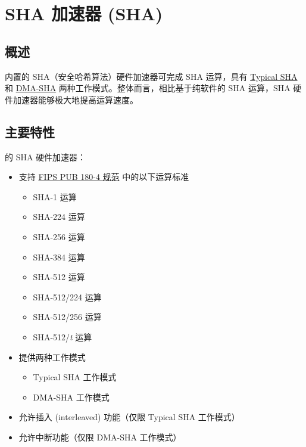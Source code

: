 \documentclass[main\_\_CN.tex]{subfiles}
\begin{document}

\ifglobal
\else
    {\let\clearpage\relax \listoftodos}
    {\let\clearpage\relax \listofdonetodos}
    \tableofcontents
\fi



\hypertarget{sha}{}
\chapter{SHA 加速器 (SHA)} \label{mod:sha}

\section{概述}

\chipname{} 内置的 SHA（安全哈希算法）硬件加速器可完成 SHA 运算，具有 \hyperref[sec:sha-typical-sha]{Typical SHA} 和 \hyperref[sec:sha-dma-sha]{DMA-SHA} 两种工作模式。整体而言，相比基于纯软件的 SHA 运算，SHA 硬件加速器能够极大地提高运算速度。

\section{主要特性}

\chipname{} 的 SHA 硬件加速器：

\begin{itemize}
    \item 支持 \href{https://doi.org/10.6028/NIST.FIPS.180-4}{FIPS PUB 180-4 规范} 中的以下运算标准
    \begin{itemize}
        \item SHA-1 运算
        \item SHA-224 运算
        \item SHA-256 运算
        \item SHA-384 运算
        \item SHA-512 运算
        \item SHA-512/224 运算
        \item SHA-512/256 运算
        \item SHA-512/{\it{t}} 运算
    \end{itemize}
    \item 提供两种工作模式
    \begin{itemize}
        \item Typical SHA 工作模式
        \item DMA-SHA 工作模式
    \end{itemize}
    \item 允许插入 (interleaved) 功能（仅限 Typical SHA 工作模式）
    \item 允许中断功能（仅限 DMA-SHA 工作模式）
\end{itemize}
\end{document}
